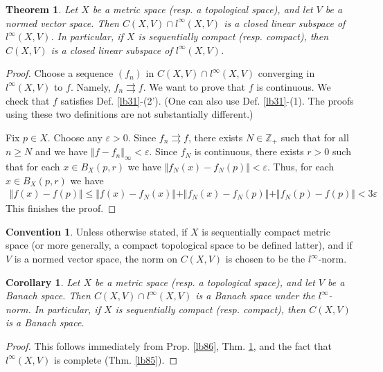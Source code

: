 \documentclass[12pt,b5paper,notitlepage]{article}
\theoremstyle{definition}
\newtheorem{cv}[df]{Convention}
\theoremstyle{plain}
\newtheorem{thm}[df]{Theorem}
\newtheorem{co}[df]{Corollary}
\newcommand{\Zbb}{\mathbb Z}
\newcommand{\eps}{\varepsilon}
\numberwithin{equation}{section}
\begin{document}
\begin{thm}\label{lb87}
Let $X$ be a metric space (resp. a topological space), and let $V$ be a normed vector space. Then $C(X,V)\cap l^\infty(X,V)$ is a closed linear subspace of $l^\infty(X,V)$. In particular, if $X$ is sequentially compact (resp. compact), then $C(X,V)$ is a closed linear subspace of $l^\infty(X,V)$.
\end{thm}



\begin{proof}
Choose a sequence $(f_n)$ in $C(X,V)\cap l^\infty(X,V)$ converging in $l^\infty(X,V)$ to $f$. Namely, $f_n\rightrightarrows f$. We want to prove that $f$ is continuous. We check that $f$ satisfies Def. \ref{lb31}-(2'). (One can also use Def. \ref{lb31}-(1). The proofs using these two definitions are not substantially different.)

Fix $p\in X$. Choose any $\eps>0$. Since $f_n\rightrightarrows f$, there exists $N\in\Zbb_+$ such that for all $n\geq N$ and we have $\Vert f-f_n\Vert_\infty<\eps$. Since $f_N$ is continuous, there exists $r>0$ such that for each $x\in B_X(p,r)$ we have $\Vert f_N(x)-f_N(p)\Vert<\eps$. Thus, for each $x\in B_X(p,r)$ we have
\begin{align*}
\Vert f(x)-f(p)\Vert\leq \Vert f(x)-f_N(x)\Vert +\Vert f_N(x)-f_N(p)\Vert+\Vert f_N(p)-f(p)\Vert<3\eps
\end{align*}
This finishes the proof.
\end{proof}





\begin{cv}\label{lb88}
Unless otherwise stated, if $X$ is sequentially compact metric space (or more generally, a compact topological space to be defined latter), and if $V$ is a normed vector space, the norm on $C(X,V)$ is chosen to be the $l^\infty$-norm.
\end{cv}


\begin{co}\label{lb101}
Let $X$ be a metric space  (resp. a topological space), and let $V$ be a Banach space. Then  $C(X,V)\cap l^\infty(X,V)$ is a Banach space under the $l^\infty$-norm. In particular, if $X$ is sequentially compact (resp. compact), then $C(X,V)$ is a Banach space.
\end{co}

\begin{proof}
This follows immediately from Prop. \ref{lb86}, Thm. \ref{lb87}, and the fact that $l^\infty(X,V)$ is complete (Thm. \ref{lb85}).
\end{proof}
\end{document}
